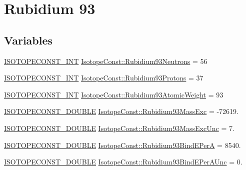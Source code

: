 \hypertarget{group___isotope_const-_rubidium-_rb93}{}\section{Rubidium 93}
\label{group___isotope_const-_rubidium-_rb93}
\subsection*{Variables}
\begin{DoxyCompactItemize}
\item 
\mbox{\hyperlink{group___isotope_const-_macros_ga5f18360b3e99483a35c32d789e62621c}{I\+S\+O\+T\+O\+P\+E\+C\+O\+N\+S\+T\+\_\+\+I\+NT}} \mbox{\hyperlink{group___isotope_const-_rubidium-_rb93_ga4727d6620eb848434df82fe4a7308075}{Isotope\+Const\+::\+Rubidium93\+Neutrons}} = 56
\item 
\mbox{\hyperlink{group___isotope_const-_macros_ga5f18360b3e99483a35c32d789e62621c}{I\+S\+O\+T\+O\+P\+E\+C\+O\+N\+S\+T\+\_\+\+I\+NT}} \mbox{\hyperlink{group___isotope_const-_rubidium-_rb93_ga83ca551de59920e16775540bfcff686e}{Isotope\+Const\+::\+Rubidium93\+Protons}} = 37
\item 
\mbox{\hyperlink{group___isotope_const-_macros_ga5f18360b3e99483a35c32d789e62621c}{I\+S\+O\+T\+O\+P\+E\+C\+O\+N\+S\+T\+\_\+\+I\+NT}} \mbox{\hyperlink{group___isotope_const-_rubidium-_rb93_ga54f36be64fd3e0df814db06fb6b81179}{Isotope\+Const\+::\+Rubidium93\+Atomic\+Weight}} = 93
\item 
\mbox{\hyperlink{group___isotope_const-_macros_ga8f45a7272ce02c0b4c65c44636ed719a}{I\+S\+O\+T\+O\+P\+E\+C\+O\+N\+S\+T\+\_\+\+D\+O\+U\+B\+LE}} \mbox{\hyperlink{group___isotope_const-_rubidium-_rb93_gaba49e934699a6609235c308c21298048}{Isotope\+Const\+::\+Rubidium93\+Mass\+Exc}} = -\/72619.
\item 
\mbox{\hyperlink{group___isotope_const-_macros_ga8f45a7272ce02c0b4c65c44636ed719a}{I\+S\+O\+T\+O\+P\+E\+C\+O\+N\+S\+T\+\_\+\+D\+O\+U\+B\+LE}} \mbox{\hyperlink{group___isotope_const-_rubidium-_rb93_gaaa07b7a6fe7d813314214a29156ef928}{Isotope\+Const\+::\+Rubidium93\+Mass\+Exc\+Unc}} = 7.
\item 
\mbox{\hyperlink{group___isotope_const-_macros_ga8f45a7272ce02c0b4c65c44636ed719a}{I\+S\+O\+T\+O\+P\+E\+C\+O\+N\+S\+T\+\_\+\+D\+O\+U\+B\+LE}} \mbox{\hyperlink{group___isotope_const-_rubidium-_rb93_gac8802728f6e0d793caab4dc0a4609c81}{Isotope\+Const\+::\+Rubidium93\+Bind\+E\+PerA}} = 8540.
\item 
\mbox{\hyperlink{group___isotope_const-_macros_ga8f45a7272ce02c0b4c65c44636ed719a}{I\+S\+O\+T\+O\+P\+E\+C\+O\+N\+S\+T\+\_\+\+D\+O\+U\+B\+LE}} \mbox{\hyperlink{group___isotope_const-_rubidium-_rb93_gad7eecc19155521c6224763b3f9f5a43c}{Isotope\+Const\+::\+Rubidium93\+Bind\+E\+Per\+A\+Unc}} = 0.

\end{DoxyCompactItemize}
